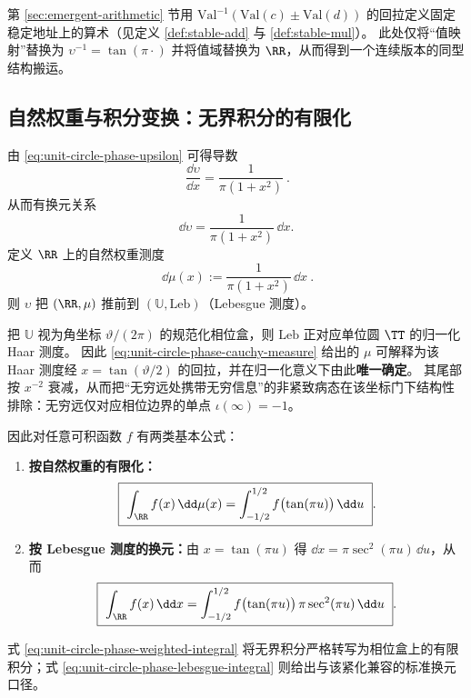 \begin{remark}\label{rem:unit-circle-phase-transport-analogy}
第 \ref{sec:emergent-arithmetic} 节用 \( \mathrm{Val}^{-1}(\mathrm{Val}(c)\pm\mathrm{Val}(d)) \) 的回拉定义固定稳定地址上的算术（见定义 \ref{def:stable-add} 与 \ref{def:stable-mul}）。
此处仅将“值映射”替换为 \(\upsilon^{-1}=\tan(\pi\cdot)\) 并将值域替换为 \(\RR\)，从而得到一个连续版本的同型结构搬运。
\end{remark}

\subsection{自然权重与积分变换：无界积分的有限化}\label{subsec:unit-circle-phase-integrals}
由 \eqref{eq:unit-circle-phase-upsilon} 可得导数
\begin{equation}\label{eq:unit-circle-phase-derivative}
\boxed{\ \frac{\dd \upsilon}{\dd x}=\frac{1}{\pi(1+x^2)}\ }.
\end{equation}
从而有换元关系
\[
\dd \upsilon=\frac{1}{\pi(1+x^2)}\,\dd x.
\]
定义 \(\RR\) 上的自然权重测度
\begin{equation}\label{eq:unit-circle-phase-cauchy-measure}
\boxed{\ \dd\mu(x):=\frac{1}{\pi(1+x^2)}\,\dd x\ }.
\end{equation}
则 \(\upsilon\) 把 \((\RR,\mu)\) 推前到 \((\mathbb{U},\mathrm{Leb})\)（Lebesgue 测度）。
\begin{remark}\label{rem:unit-circle-phase-haar-pullback-weight}
把 \(\mathbb{U}\) 视为角坐标 \(\vartheta/(2\pi)\) 的规范化相位盒，则 \(\mathrm{Leb}\) 正对应单位圆 \(\TT\) 的归一化 Haar 测度。
因此 \eqref{eq:unit-circle-phase-cauchy-measure} 给出的 \(\mu\) 可解释为该 Haar 测度经 \(x=\tan(\vartheta/2)\) 的回拉，并在归一化意义下由此\textbf{唯一确定}。
其尾部按 \(x^{-2}\) 衰减，从而把“无穷远处携带无穷信息”的非紧致病态在该坐标门下结构性排除：无穷远仅对应相位边界的单点 \(\iota(\infty)=-1\)。
\end{remark}
因此对任意可积函数 \(f\) 有两类基本公式：
\begin{enumerate}
  \item \textbf{按自然权重的有限化：}
  \begin{equation}\label{eq:unit-circle-phase-weighted-integral}
  \boxed{\ \int_{\RR} f(x)\,\dd\mu(x)=\int_{-1/2}^{1/2} f\bigl(\tan(\pi u)\bigr)\,\dd u\ }.
  \end{equation}
  \item \textbf{按 Lebesgue 测度的换元：}由 \(x=\tan(\pi u)\) 得 \(\dd x=\pi\sec^2(\pi u)\,\dd u\)，从而
  \begin{equation}\label{eq:unit-circle-phase-lebesgue-integral}
  \boxed{\ \int_{\RR} f(x)\,\dd x=\int_{-1/2}^{1/2} f\bigl(\tan(\pi u)\bigr)\,\pi\sec^2(\pi u)\,\dd u\ }.
  \end{equation}
\end{enumerate}
式 \eqref{eq:unit-circle-phase-weighted-integral} 将无界积分严格转写为相位盒上的有限积分；式 \eqref{eq:unit-circle-phase-lebesgue-integral} 则给出与该紧化兼容的标准换元口径。

